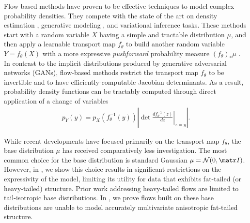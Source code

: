 \documentclass[../../thesis.tex]{subfiles}
\begin{document}
Flow-based methods
\citep{papamakarios2021normalizing}
have proven to be effective techniques to model complex
probability densities. They compete with the state of the art on
density estimation \citep{huang2018neural,durkan2019neural,jaini2020tails},
generative modeling \citep{chen2019residual,kingma2018glow}, and variational inference \citep{kingma2016improved,agrawal2020advances} tasks.
These methods start with a random variable $X$ having a simple and tractable
distribution $\mu$, and then apply a learnable transport map $f_\theta$ to build
another random variable $Y = f_\theta(X)$ with a more expressive \emph{pushforward}
probability measure $(f_\theta)_\ast \mu$ \citep{papamakarios2021normalizing}.
In contrast to the implicit distributions \citep{huszar2017variational} produced by generative adversarial networks (GANs), flow-based methods restrict the transport map $f_\theta$ to be invertible and to have efficiently-computable Jacobian determinants.
As a result, probability density functions can be tractably computed
through direct application of a change of variables
\begin{align}
  \label{eq:change-of-variable}
  p_{Y}(y)
  = p_{X}(f_\theta^{-1}(y)) \left\lvert \det
  \left.\frac{d f_\theta^{-1}(z)}{dz} \right\vert_{z=y}
  \right\rvert .
\end{align}

While recent developments \citep{chen2019residual,huang2018neural,durkan2019neural} have focused primarily
on the transport map $f_\theta$, the base distribution $\mu$ has received comparatively less investigation.
The most common choice for the base distribution is standard Gaussian $\mu = \cN(0,\mI)$.
However, in , we show this choice results in significant
restrictions on the expressivity of the model, limiting its utility for data that
exhibits fat-tailed (or heavy-tailed) structure.
Prior work addressing heavy-tailed flows \citep{jaini2020tails}
are limited to tail-isotropic base distributions.
In , we prove flows built on these base distributions
are unable to model accurately multivariate anisotropic fat-tailed structure.
\end{document}
